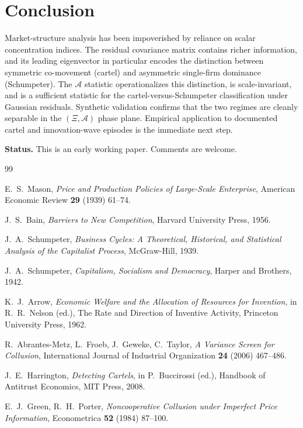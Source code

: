 \documentclass[12pt,a4paper]{article}
\newcommand{\SEA}{\mathcal{A}}
\begin{document}
\section{Conclusion}
\label{sec:conclusion}

Market-structure analysis has been impoverished by reliance on scalar concentration indices. The residual covariance matrix contains richer information, and its leading eigenvector in particular encodes the distinction between symmetric co-movement (cartel) and asymmetric single-firm dominance (Schumpeter). The $\SEA$ statistic operationalizes this distinction, is scale-invariant, and is a sufficient statistic for the cartel-versus-Schumpeter classification under Gaussian residuals. Synthetic validation confirms that the two regimes are cleanly separable in the $(\Xi, \SEA)$ phase plane. Empirical application to documented cartel and innovation-wave episodes is the immediate next step.

\vspace{0.4cm}


\vspace{0.3cm}

\textbf{Status.} This is an early working paper. Comments are welcome.

\vspace{0.8cm}

\begin{thebibliography}{99}

E.~S.~Mason, \textit{Price and Production Policies of Large-Scale Enterprise}, American Economic Review \textbf{29} (1939) 61--74.

J.~S.~Bain, \textit{Barriers to New Competition}, Harvard University Press, 1956.

J.~A.~Schumpeter, \textit{Business Cycles: A Theoretical, Historical, and Statistical Analysis of the Capitalist Process}, McGraw-Hill, 1939.

J.~A.~Schumpeter, \textit{Capitalism, Socialism and Democracy}, Harper and Brothers, 1942.

K.~J.~Arrow, \textit{Economic Welfare and the Allocation of Resources for Invention}, in R.~R.~Nelson (ed.), The Rate and Direction of Inventive Activity, Princeton University Press, 1962.

R.~Abrantes-Metz, L.~Froeb, J.~Geweke, C.~Taylor, \textit{A Variance Screen for Collusion}, International Journal of Industrial Organization \textbf{24} (2006) 467--486.

J.~E.~Harrington, \textit{Detecting Cartels}, in P.~Buccirossi (ed.), Handbook of Antitrust Economics, MIT Press, 2008.

E.~J.~Green, R.~H.~Porter, \textit{Noncooperative Collusion under Imperfect Price Information}, Econometrica \textbf{52} (1984) 87--100.

\end{thebibliography}
\end{document}
